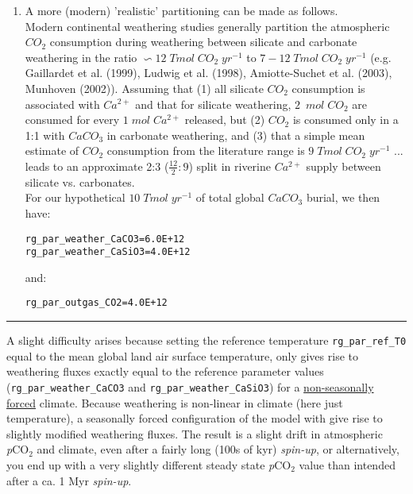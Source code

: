 \begin{enumerate}
\vspace{2mm}
\item 
A more (modern) 'realistic' partitioning can be made as follows.
\vspace{1mm}
\\Modern continental weathering studies generally partition the atmospheric \(CO_{2}\) consumption during weathering between silicate and carbonate weathering in the ratio \(\backsim12\;Tmol\;CO_{2}\;yr^{-1}\) to \(7-12\;Tmol\;CO_{2}\;yr^{-1}\) (e.g. Gaillardet et al. (1999), Ludwig et al. (1998), Amiotte-Suchet et al. (2003), Munhoven (2002)). Assuming that (1) all silicate \(CO_{2}\) consumption is associated with \(Ca^{2+}\) and that for silicate weathering, \(2\;\ mol\; CO_{2}\) are consumed for every \(1\;mol\;Ca^{2+}\) released, but (2) \(CO_{2}\) is consumed only in a 1:1 with \(CaCO_{3}\) in carbonate weathering, and (3) that a simple mean estimate of  \(CO_{2}\) consumption from the literature range is  \(9\;Tmol\;CO_{2}\;yr^{-1}\) ... leads to an approximate 2:3 (\(\frac{12}{2}:9\)) split in riverine \(Ca^{2+}\) supply between silicate vs. carbonates.
\vspace{1mm}
\\For our hypothetical \(10\;Tmol\;yr^{-1}\) of total global \(CaCO_{3}\) burial, we then have:
\vspace{-1mm}\small\begin{verbatim}
rg_par_weather_CaCO3=6.0E+12
rg_par_weather_CaSiO3=4.0E+12
\end{verbatim}\normalsize\vspace{-1mm}
and:
\vspace{-1mm}\small\begin{verbatim}
rg_par_outgas_CO2=4.0E+12
\end{verbatim}\normalsize\vspace{-1mm}

\end{enumerate}

\vspace{0mm}
\noindent\rule{4cm}{0.5pt}
\vspace{2mm}

\noindent A slight difficulty arises because setting the reference temperature \texttt{rg\_par\_ref\_T0} equal to the mean global land air surface temperature, only gives rise to weathering fluxes exactly equal to the reference parameter values (\texttt{rg\_par\_weather\_CaCO3} and \texttt{rg\_par\_weather\_CaSiO3}) for a \uline{non-seasonally forced} climate. Because weathering is non-linear in climate (here just temperature), a seasonally forced configuration of the model with give rise to slightly modified weathering fluxes. The result is a slight drift in atmospheric \textit{p}CO${_2}$ and climate, even after a fairly long (100s of kyr) \textit{spin-up}, or alternatively, you end up with a very  slightly different steady state \textit{p}CO${_2}$ value than intended after a ca. 1 Myr \textit{spin-up}.

